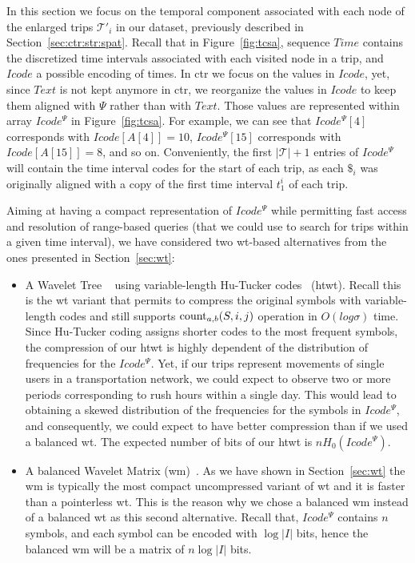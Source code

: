 	In this section we focus on the temporal component associated with each node of the enlarged trips $\mathcal{T}'_i$ 
	in our dataset, previously described in Section~\ref{sec:ctr:str:spat}. Recall that in Figure~\ref{fig:tcsa}, sequence $Time$ contains the discretized time intervals
	associated with each visited node in a trip, and $Icode$ a possible encoding of times.
	In \gls{ctr} we focus on the values in $Icode$, yet, since $Text$ is not kept anymore in \gls{ctr}, we 
	reorganize the values in $Icode$ to keep them aligned with $\Psi$ rather than with $Text$. Those
	values are represented within array $Icode^{\Psi}$ in Figure~\ref{fig:tcsa}. 
	For example, we can see that $Icode^{\Psi}[4]$ corresponds with $Icode[A[4]]=10$, 
	$Icode^{\Psi}[15]$ corresponds with $Icode[A[15]]=8$, and so on. Conveniently, the first $|\mathcal{T}| + 1$ entries of $Icode^{\Psi}$ will contain the time interval codes for the start of each trip, as each $\$_i$ was originally aligned with a copy of the first time interval $t^i_1$ of each trip.

	Aiming at having a compact representation of $Icode^{\Psi}$ while permitting fast 
	access and resolution of range-based queries (that we could use to search for trips within 
	a given time interval), we have considered two \gls{wt}-based alternatives from the ones presented in Section~\ref{sec:wt}:

	\begin{itemize}
	  \item A Wavelet Tree ~\cite{WT03} using variable-length Hu-Tucker codes~\cite{hu1971optimal} (\gls{htwt}).
	  Recall this is the \gls{wt} variant that permits to compress the original symbols with variable-length codes and 
	  still supports $\operatorname{count}_{a,b}(S,i,j)$ operation in $O(log\sigma)$ time. Since Hu-Tucker coding assigns shorter codes
	  to the most frequent symbols, the compression of our \gls{htwt} is highly dependent of the distribution
	  of frequencies for the $Icode^{\Psi}$. Yet, if our 
	  trips represent movements of single users in a transportation network, we could expect to observe two or more periods 
	  corresponding to rush hours within a single day. This would lead to obtaining a skewed distribution of the frequencies 
	  for the symbols in $Icode^{\Psi}$, and consequently, we could expect to have better compression than if we used a 
	  balanced \gls{wt}. The expected number of bits of our \gls{htwt} is $nH_0(Icode^{\Psi})$.

	  \item A balanced Wavelet Matrix (\gls{wm})~\cite{CNO15}. As we have shown in Section~\ref{sec:wt} the \gls{wm} is typically the most
	  compact uncompressed variant of \gls{wt} and it is faster than a pointerless \gls{wt}. This is the reason why we chose
	  a balanced \gls{wm} instead of a balanced \gls{wt} as this second alternative. Recall that, $Icode^{\Psi}$ contains $n$ symbols, 
	  and each symbol can be encoded with $\log  |I|$ bits, hence the 
	  balanced \gls{wm} will be a matrix of $n  \log|I|$ bits.
	\end{itemize}
	
